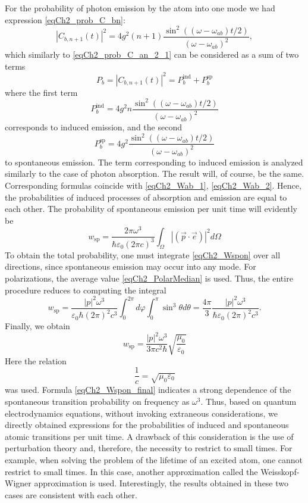 For the probability of photon emission by the atom into one mode we had expression
\eqref{eqCh2_prob_C_bn}:
\[
\left|C_{b, n + 1}\left(t\right)\right|^2 = 4 g^2 \left(n + 1\right)
\frac{\sin^2\left(\left(\omega - \omega_{ab}\right)t/2\right)}
{\left(\omega - \omega_{ab}\right)^2},
\]
which similarly to \eqref{eqCh2_prob_C_an_2_1} can be considered as a sum of two terms
\[
P_b = \left|C_{b, n + 1}\left(t\right)\right|^2 =
P_b^{\mbox{ind}} + P_b^{\mbox{sp}}
\]
where the first term
\[
P_b^{\mbox{ind}} = 4 g^2 n
\frac{\sin^2\left(\left(\omega - \omega_{ab}\right)t/2\right)}
{\left(\omega - \omega_{ab}\right)^2}
\]
corresponds to induced emission, and
the second
\[
P_b^{\mbox{sp}} = 4 g^2 
\frac{\sin^2\left(\left(\omega - \omega_{ab}\right)t/2\right)}
{\left(\omega - \omega_{ab}\right)^2}
\]
to spontaneous emission. The term corresponding to induced emission is analyzed similarly to the case of photon absorption. The result will, of course, be the same. Corresponding formulas coincide with \eqref{eqCh2_Wab_1}, 
\eqref{eqCh2_Wab_2}. Hence, the probabilities of induced processes of absorption and emission are equal to each other. The probability of spontaneous emission per unit time will evidently be 
\begin{equation}
w_{\mbox{sp}} = 
\frac{2 \pi \omega^3}
{\hbar \varepsilon_0 \left(2 \pi c\right)^3}
\int_{\Omega}
\left|\left(\vec{p} \cdot \vec{e}\right)\right|^2
d \Omega
\label{eqCh2_Wspon}
\end{equation}
To obtain the total probability, one must integrate \eqref{eqCh2_Wspon}
over all directions, since spontaneous emission may occur into any mode. For polarizations, the average value \eqref{eqCh2_PolarMedian} is used. Thus, the entire procedure reduces to computing the integral 
\begin{equation}
w_{\mbox{sp}} = 
\frac{\left|p\right|^2 \omega^3}
{\varepsilon_0 \hbar \left(2 \pi\right)^2 c^3}
\int_{0}^{2 \pi}d \varphi \int_0^{\pi}
\sin^3 \theta d \theta
= 
\frac{4 \pi}{3}\frac{\left|p\right|^2 \omega^3}
{\hbar \varepsilon_0 \left(2 \pi\right)^2 c^3}.
\end{equation}
Finally, we obtain
\begin{equation}
w_{\mbox{sp}} = 
\frac{\left|p\right|^2 \omega^3}
{3 \pi c^2 \hbar}
\sqrt{\frac{\mu_0}{\varepsilon_0}}
\label{eqCh2_Wspon_final}
\end{equation}
Here the relation  
\[
\frac{1}{c} = \sqrt{\mu_0 \varepsilon_0}
\]
was used.
Formula \eqref{eqCh2_Wspon_final} indicates a strong
dependence of the spontaneous transition probability on frequency as  
$\omega^3$. Thus,
based on quantum electrodynamics equations, without invoking extraneous considerations, we directly obtained
expressions for the probabilities of induced and spontaneous atomic transitions per
unit time. A drawback of this consideration is the use of perturbation theory and, therefore, the necessity to restrict to
small times. For example, when solving the problem of the lifetime
of an excited atom, one cannot restrict to small times. In this case, another approximation called the Weisskopf-Wigner approximation \cite{bLuisell1972} is used. Interestingly, the results
obtained in these two cases are consistent with each other.  

